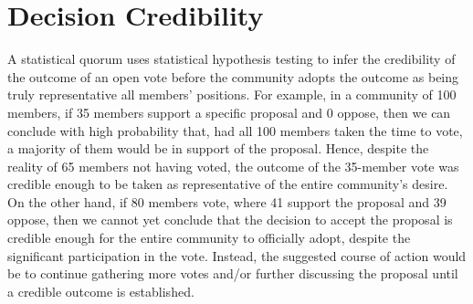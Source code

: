 \documentclass[chi_draft]{sigchi}
\begin{document}
%
%
%
%
%

\section{Decision Credibility}
\label{sec:decision-credibility}
A statistical quorum uses statistical hypothesis testing to infer the credibility of the outcome of an open vote before the community adopts the outcome as being truly representative all members' positions.
For example, in a community of 100 members, if 35 members support a specific proposal and 0 oppose, then we can conclude with high probability that, had all 100 members taken the time to vote, a majority of them would be in support of the proposal.  Hence, despite the reality of 65 members not having voted, the outcome of the 35-member vote was credible enough to be taken as representative of the entire community's desire.
On the other hand, if 80 members vote, where 41 support the proposal and 39 oppose, then we cannot yet conclude that the decision to accept the proposal is credible enough for the entire community to officially adopt, despite the significant participation in the vote.
Instead, the suggested course of action would be to continue gathering more votes and/or further discussing the proposal until a credible outcome is established.
\end{document}
